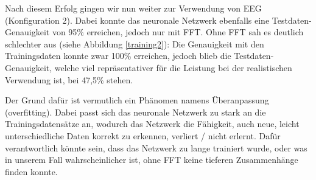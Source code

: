 \documentclass[11pt]{scrartcl}
\begin{document}
	\begin{figure}[H]
	\end{figure}



	Nach diesem Erfolg gingen wir nun weiter zur Verwendung von EEG (Konfiguration 2). Dabei konnte das neuronale Netzwerk ebenfalls eine Testdaten-Genauigkeit von 95\% erreichen, jedoch nur mit FFT. Ohne FFT sah es deutlich schlechter aus (siehe Abbildung \ref{training2}): Die Genauigkeit mit den Trainingsdaten konnte zwar 100\% erreichen, jedoch blieb die Testdaten-Genauigkeit, welche viel repräsentativer für die Leistung bei der realistischen Verwendung ist, bei 47,5\% stehen.

	Der Grund dafür ist vermutlich ein Phänomen namens Überanpassung (overfitting). Dabei passt sich das neuronale Netzwerk zu stark an die Trainingsdatensätze an, wodurch das Netzwerk die Fähigkeit, auch neue, leicht unterschiedliche Daten korrekt zu erkennen, verliert / nicht erlernt. Dafür verantwortlich könnte sein, dass das Netzwerk zu lange trainiert wurde, oder was in unserem Fall wahrscheinlicher ist, ohne FFT keine tieferen Zusammenhänge finden konnte.
\end{document}
